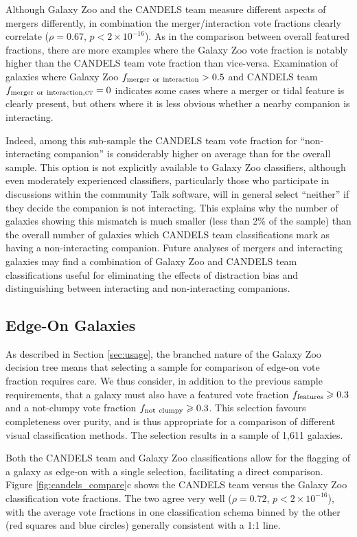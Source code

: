 \documentclass[useAMS,usenatbib]{mn2e}
\begin{document}
{Although Galaxy Zoo and the CANDELS team measure different aspects of mergers differently, in combination the merger/interaction vote fractions clearly correlate ($\rho = 0.67$, $p < 2 \times 10^{-16}$). As in the comparison between overall featured fractions, there are more examples where the Galaxy Zoo vote fraction is notably higher than the CANDELS team vote fraction than vice-versa. Examination of galaxies where Galaxy Zoo $f_{\rm merger\ or\ interaction} > 0.5$ and CANDELS team $f_{\rm merger\ or\ interaction, \textsc{ct}} = 0$ indicates some cases where a merger or tidal feature is clearly present, but others where it is less obvious whether a nearby companion is interacting. 

Indeed, among this sub-sample the CANDELS team vote fraction for ``non-interacting companion'' is considerably higher on average than for the overall sample. This option is not explicitly available to Galaxy Zoo classifiers, although even moderately experienced classifiers, particularly those who participate in discussions within the community Talk software, will in general select ``neither'' if they decide the companion is not interacting. This explains why the number of galaxies showing this mismatch is much smaller (less than 2\% of the sample) than the overall number of galaxies which CANDELS team classifications mark as having a non-interacting companion. Future analyses of mergers and interacting galaxies may find a combination of Galaxy Zoo and CANDELS team classifications useful for eliminating the effects of distraction bias and distinguishing between interacting and non-interacting companions.



\subsection{Edge-On Galaxies}

As described in Section \ref{sec:usage}, the branched nature of the Galaxy Zoo decision tree means that selecting a sample for comparison of edge-on vote fraction requires care. We thus consider, in addition to the previous sample requirements, that a galaxy must also have a featured vote fraction $f_{\rm features} \geq 0.3$ and a not-clumpy vote fraction $f_{\rm not\ clumpy} \geq 0.3$. This selection favours completeness over purity, and is thus appropriate for a comparison of different visual classification methods. The selection results in a sample of 1,611 galaxies.

Both the CANDELS team and Galaxy Zoo classifications allow for the flagging of a galaxy as edge-on with a single selection, facilitating a direct comparison. Figure \ref{fig:candels_compare}c shows the CANDELS team versus the Galaxy Zoo classification vote fractions. The two agree very well ($\rho = 0.72$, $p < 2 \times 10^{-16}$), with the average vote fractions in one classification schema binned by the other (red squares and blue circles) generally consistent with a 1:1 line. 



}
\end{document}
